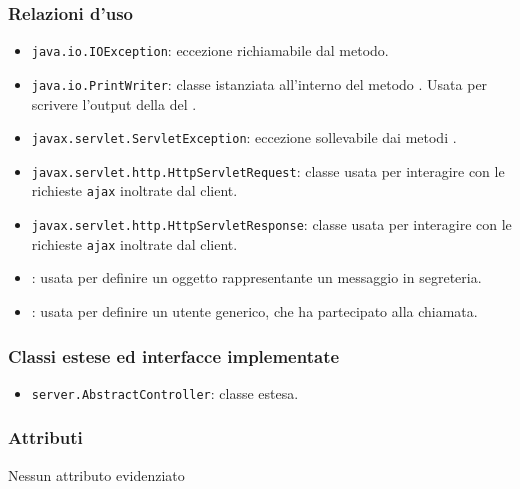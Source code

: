 \subsubsection*{Relazioni d'uso}
\begin{itemize}
	\item \texttt{java.io.IOException}: eccezione richiamabile dal metodo.
	\item \texttt{java.io.PrintWriter}: classe istanziata all'interno del metodo . Usata per scrivere l'output della del .
	\item \texttt{javax.servlet.ServletException}: eccezione sollevabile dai metodi .
	\item \texttt{javax.servlet.http.HttpServletRequest}: classe usata per interagire con le richieste \texttt{ajax} inoltrate dal client.
	\item \texttt{javax.servlet.http.HttpServletResponse}: classe usata per interagire con le richieste \texttt{ajax} inoltrate dal client.
	\item {}: usata per definire un oggetto rappresentante un messaggio in segreteria.
	\item {}: usata per definire un utente generico, che ha partecipato alla chiamata.
\end{itemize}

\subsubsection*{Classi estese ed interfacce implementate}
\begin{itemize}
	\item \texttt{server.AbstractController}: classe estesa.
\end{itemize}

\subsubsection*{Attributi}

Nessun attributo evidenziato

